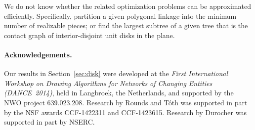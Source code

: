 \documentclass[runningheads]{article}
\begin{document}
We do not know whether the related optimization problems can be approximated efficiently. Specifically, partition a given polygonal linkage into the minimum number of realizable pieces; or find the largest subtree of a given tree that is the contact graph of interior-disjoint unit disks in the plane.

\paragraph{\bf Acknowledgements.} Our results in Section~\ref{sec:disk} were developed at the \emph{First International Workshop on Drawing Algorithms for Networks of Changing Entities (DANCE~2014)}, held in Langbroek, the Netherlands, and supported by the NWO project
639.023.208.
Research by Rounds and T\'oth was supported in part by the NSF awards CCF-1422311 and CCF-1423615.
Research by Durocher was supported in part by NSERC.
\end{document}
